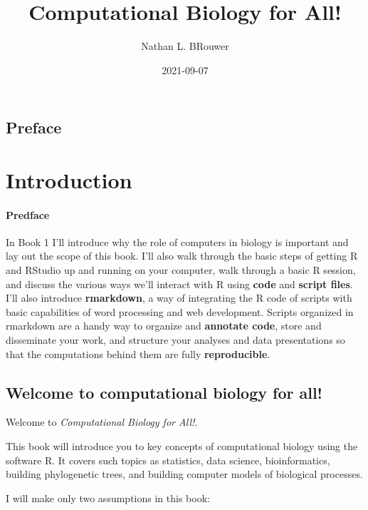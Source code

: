 \documentclass[
]{book}
\title{Computational Biology for All!}
\author{Nathan L. BRouwer}
\date{2021-09-07}
\begin{document}
\maketitle

{
\setcounter{tocdepth}{1}
\tableofcontents
}
\hypertarget{preface}{%
\chapter*{Preface}\label{preface}}

\hypertarget{part-introduction}{%
\part{Introduction}\label{part-introduction}}

\hypertarget{predface}{%
\subsection*{Predface}\label{predface}}

In Book 1 I'll introduce why the role of computers in biology is important and lay out the scope of this book. I'll also walk through the basic steps of getting R and RStudio up and running on your computer, walk through a basic R session, and discuss the various ways we'll interact with R using \textbf{code} and \textbf{script files}. I'll also introduce \textbf{rmarkdown}, a way of integrating the R code of scripts with basic capabilities of word processing and web development. Scripts organized in rmarkdown are a handy way to organize and \textbf{annotate code}, store and disseminate your work, and structure your analyses and data presentations so that the computations behind them are fully \textbf{reproducible}.

\hypertarget{intro}{%
\chapter{Welcome to computational biology for all!}\label{intro}}

Welcome to \emph{Computational Biology for All!}.

This book will introduce you to key concepts of computational biology using the software R. It covers such topics as statistics, data science, bioinformatics, building phylogenetic trees, and building computer models of biological processes.

I will make only two assumptions in this book:
\end{document}
